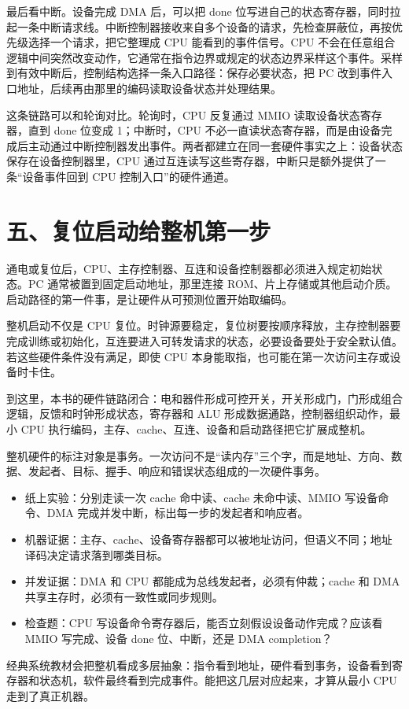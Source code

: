 最后看中断。设备完成 DMA 后，可以把 done 位写进自己的状态寄存器，同时拉起一条中断请求线。中断控制器接收来自多个设备的请求，先检查屏蔽位，再按优先级选择一个请求，把它整理成 CPU 能看到的事件信号。CPU 不会在任意组合逻辑中间突然改变动作，它通常在指令边界或规定的状态边界采样这个事件。采样到有效中断后，控制结构选择一条入口路径：保存必要状态，把 PC 改到事件入口地址，后续再由那里的编码读取设备状态并处理结果。

这条链路可以和轮询对比。轮询时，CPU 反复通过 MMIO 读取设备状态寄存器，直到 done 位变成 1；中断时，CPU 不必一直读状态寄存器，而是由设备完成后主动通过中断控制器发出事件。两者都建立在同一套硬件事实之上：设备状态保存在设备控制器里，CPU 通过互连读写这些寄存器，中断只是额外提供了一条“设备事件回到 CPU 控制入口”的硬件通道。

\section{五、复位启动给整机第一步}

通电或复位后，CPU、主存控制器、互连和设备控制器都必须进入规定初始状态。PC 通常被置到固定启动地址，那里连接 ROM、片上存储或其他启动介质。启动路径的第一件事，是让硬件从可预测位置开始取编码。

整机启动不仅是 CPU 复位。时钟源要稳定，复位树要按顺序释放，主存控制器要完成训练或初始化，互连要进入可转发请求的状态，必要设备要处于安全默认值。若这些硬件条件没有满足，即使 CPU 本身能取指，也可能在第一次访问主存或设备时卡住。

到这里，本书的硬件链路闭合：电和器件形成可控开关，开关形成门，门形成组合逻辑，反馈和时钟形成状态，寄存器和 ALU 形成数据通路，控制器组织动作，最小 CPU 执行编码，主存、cache、互连、设备和启动路径把它扩展成整机。

\begin{classicnote}
整机硬件的标注对象是事务。一次访问不是“读内存”三个字，而是地址、方向、数据、发起者、目标、握手、响应和错误状态组成的一次硬件事务。

\begin{itemize}
\item 纸上实验：分别走读一次 cache 命中读、cache 未命中读、MMIO 写设备命令、DMA 完成并发中断，标出每一步的发起者和响应者。
\item 机器证据：主存、cache、设备寄存器都可以被地址访问，但语义不同；地址译码决定请求落到哪类目标。
\item 并发证据：DMA 和 CPU 都能成为总线发起者，必须有仲裁；cache 和 DMA 共享主存时，必须有一致性或同步规则。
\item 检查题：CPU 写设备命令寄存器后，能否立刻假设设备动作完成？应该看 MMIO 写完成、设备 done 位、中断，还是 DMA completion？
\end{itemize}

经典系统教材会把整机看成多层抽象：指令看到地址，硬件看到事务，设备看到寄存器和状态机，软件最终看到完成事件。能把这几层对应起来，才算从最小 CPU 走到了真正机器。
\end{classicnote}
